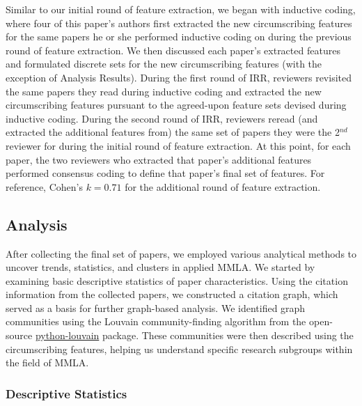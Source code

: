 \documentclass[manuscript,screen,review]{acmart}
\begin{document}
Similar to our initial round of feature extraction, we began with inductive coding, where four of this paper's authors first extracted the new circumscribing features for the same papers he or she performed inductive coding on during the previous round of feature extraction. We then discussed each paper's extracted features and formulated discrete sets for the new circumscribing features (with the exception of Analysis Results). During the first round of IRR, reviewers revisited the same papers they read during inductive coding and extracted the new circumscribing features pursuant to the agreed-upon feature sets devised during inductive coding. During the second round of IRR, reviewers reread (and extracted the additional features from) the same set of papers they were the 2$^{nd}$ reviewer for during the initial round of feature extraction. At this point, for each paper, the two reviewers who extracted that paper's additional features performed consensus coding to define that paper's final set of features. For reference, Cohen's $k=0.71$ for the additional round of feature extraction.

\subsection{Analysis}

After collecting the final set of papers, we employed various analytical methods to uncover trends, statistics, and clusters in applied MMLA. We started by examining basic descriptive statistics of paper characteristics. Using the citation information from the collected papers, we constructed a citation graph, which served as a basis for further graph-based analysis. We identified graph communities using the Louvain community-finding algorithm from the open-source \href{https://github.com/taynaud/python-louvain}{python-louvain} package. These communities were then described using the circumscribing features, helping us understand specific research subgroups within the field of MMLA.    


\subsubsection{Descriptive Statistics}
\end{document}
